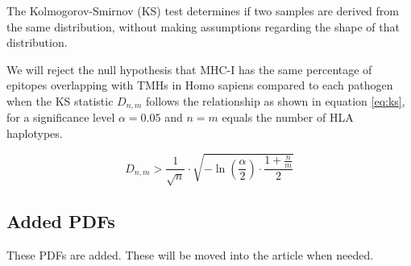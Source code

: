 
The Kolmogorov-Smirnov (KS) test determines if two samples
are derived from the same distribution, without making assumptions
regarding the shape of that distribution. 

We will reject
the null hypothesis that MHC-I has the same percentage of epitopes 
overlapping with TMHs in Homo sapiens compared to each pathogen when 
the KS statistic $D_{n,m}$ follows the relationship as shown in 
equation \ref{eq:ks}, for a significance level $\alpha = 0.05$
and $n = m$ equals the number of HLA haplotypes.

\begin{equation}
   D_{n,m} > \frac{1}{\sqrt{n}} \cdot \sqrt{ -\ln(\frac{\alpha}{2}) \cdot \frac{1 + \frac{n}{m}}{2} }
   \label{eq:ks}
\end{equation}

\subsection{Added PDFs}

These PDFs are added. These will be moved into the article when needed.


